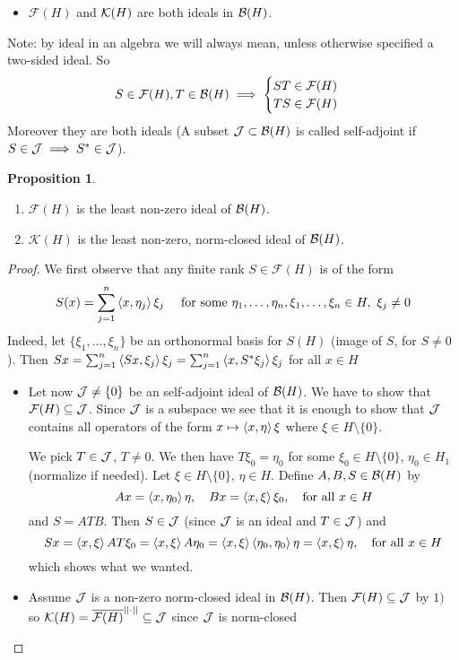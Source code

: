 \documentclass[10pt,english,a4paper]{article}
\theoremstyle{definition}
\newtheorem*{proposition}{Proposition}
\let\emph\relax %
\def\Ff{\mathcal{F}}
\def\Kf{\mathcal{K}}
\begin{document}
\begin{itemize}
    \item $\Ff(H)$ and $\mathcal{K}(H)$ are both ideals in $\mathcal{B}(H)$. 
\end{itemize}
Note: by ideal in an algebra we will always mean, unless otherwise specified a two-sided ideal.
So 
\[S \in \Ff(H), T \in \Bs(H)  \implies \begin{cases} ST \in \Ff(H) \\ TS \in \Ff(H) \end{cases}\]
Moreover they are both \emph{self-adjoint} ideals (A subset $\mathcal{J} \subset
\mathcal{B}(H)$ is called self-adjoint if $S \in \mathcal{J} \implies S^* \in \mathcal{J}$).
\begin{proposition}
\leavevmode
\begin{enumerate}[1)]
        \item $\Ff(H)$ is the least non-zero ideal of $\mathcal{B}(H)$. 
        \item $\Kf(H)$ is the least non-zero, norm-closed ideal of $\mathcal{B}(H)$. 
    \end{enumerate}
\end{proposition}
\begin{proof}
    We first observe that any finite rank $S \in \Ff(H)$ is of the form 
    \[ S(x) = \sum_{j=1}^{n} \left\langle x,\eta_j \right\rangle\xi_j  \quad \text{ for some }\eta_1, 
    \ldots, \eta_n,\xi_1,\ldots, \xi_n\in H, ~\xi_j \neq 0\]
    Indeed, let $\{\xi_1, \ldots, \xi_n\}$ be an orthonormal basis for $S(H)$ (image of $S$, for $S\neq 0$). Then $Sx = \sum_{j=1}^{n} \left\langle Sx, \xi_j \right\rangle\xi_j = \sum_{j=1}^{n}\left\langle x,S^*\xi_j \right\rangle\xi_j$ for all $x \in H$

\begin{itemize}
    \item 
Let now $\mathcal{J} \neq \{0\}$ be an self-adjoint ideal of $\mathcal{B}(H)$. We have to show that 
$\Ff(H) \subseteq \Js$. Since $\mathcal{J}$ is a subspace we see that it is enough to show that 
$\mathcal{J}$ contains all operators of the form $x\mapsto \left\langle x,\eta \right\rangle\xi$ where $\xi
\in H\setminus\{0\}$.

We pick $T \in \mathcal{J}$, $T \neq 0$. We then have $T\xi_0 = \eta_0$ for some 
$\xi_0 \in H\setminus\{0\}$, $\eta_0 \in H_1$ (normalize if needed). Let
$\xi\in H\setminus\{0\}$, $\eta \in H$. Define $A,B,S \in \mathcal{B}(H)$ by 
\[  Ax = \left\langle x,\eta_0 \right\rangle\eta, \quad Bx = \left\langle x,\xi \right\rangle\xi_0, \quad \text{for all } x\in H \]
and $S = ATB$. Then $S \in \mathcal{J}$ (since $\mathcal{J}$ is an ideal and $T \in \mathcal{J}$) and 
\[Sx = \left\langle x,\xi \right\rangle AT\xi_0 = \left\langle x,\xi \right\rangle A\eta_0 = \left\langle x,\xi \right\rangle \left\langle \eta_0,\eta_0 \right\rangle\eta
= \left\langle x,\xi \right\rangle\eta, \quad \text{for all }x\in H\]
which shows what we wanted.

\item Assume $\mathcal{J}$ is a non-zero norm-closed ideal in $\mathcal{B}(H)$. Then $\Ff(H) \subseteq \Js$
by $1)$ so $\Kf(H) =\ol{\Ff(H)}^{||\cdot||}  \subseteq \Js$ since $\mathcal{J}$ is norm-closed
\end{itemize}
\end{proof}
\end{document}
